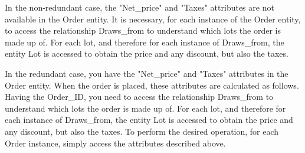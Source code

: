 In the non-redundant case, the "Net_price" and "Taxes" attributes are not available in the Order entity. It is necessary, for each instance of the Order entity, to access the relationship Draws_from to understand which lots the order is made up of. For each lot, and therefore for each instance of Draws_from, the entity Lot is accessed to obtain the price and any discount, but also the taxes.

In the redundant case, you have the "Net_price" and "Taxes" attributes in the Order entity. When the order is placed, these attributes are calculated as follows. Having the Order_ID, you need to access the relationship Draws_from to understand which lots the order is made up of. For each lot, and therefore for each instance of Draws_from, the entity Lot is accessed to obtain the price and any discount, but also the taxes. To perform the desired operation, for each Order instance, simply access the attributes described above.















